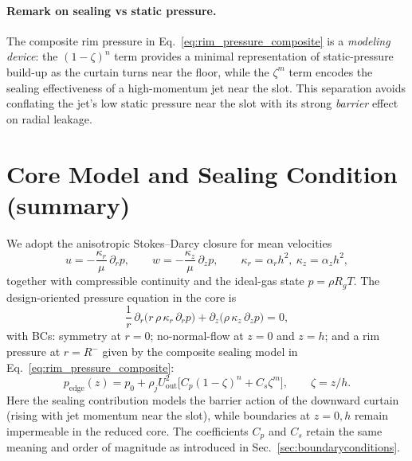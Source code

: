 \documentclass[11pt,a4paper]{article}
\begin{document}
\paragraph{Remark on sealing vs static pressure.}
The composite rim pressure in Eq.~\eqref{eq:rim_pressure_composite} is a
\emph{modeling device}: the $(1-\zeta)^n$ term provides a minimal representation
of static-pressure build-up as the curtain turns near the floor, while the
$\zeta^m$ term encodes the sealing effectiveness of a high-momentum jet near the slot.
This separation avoids conflating the jet’s low static pressure near the slot with
its strong \emph{barrier} effect on radial leakage.

\section{Core Model and Sealing Condition (summary)}
We adopt the anisotropic Stokes--Darcy closure for mean velocities
\begin{equation}
  u = -\frac{\kappa_r}{\mu}\,\partial_r p,\qquad
  w = -\frac{\kappa_z}{\mu}\,\partial_z p,\qquad
  \kappa_r=\alpha_r h^2,\ \kappa_z=\alpha_z h^2,
\end{equation}
together with compressible continuity and the ideal-gas state $p=\rho R_g T$.
The design-oriented pressure equation in the core is
\begin{equation}
  \frac{1}{r}\,\partial_r\!\big(r\,\rho\,\kappa_r\,\partial_r p\big)
  +\partial_z\!\big(\rho\,\kappa_z\,\partial_z p\big)=0,
\end{equation}
with BCs: symmetry at $r=0$; no-normal-flow at $z=0$ and $z=h$; and a rim pressure
at $r=R^{-}$ given by the composite sealing model in
Eq.~\eqref{eq:rim_pressure_composite}:
\begin{equation}
  p_{\mathrm{edge}}(z) = p_0 + \rho_j U_{\mathrm{out}}^2
  \big[ C_p(1-\zeta)^{n} + C_s \zeta^{m} \big], \qquad \zeta=z/h.
\end{equation}
Here the sealing contribution models the barrier action of the downward curtain
(rising with jet momentum near the slot), while boundaries at $z=0,h$ remain
impermeable in the reduced core. The coefficients $C_p$ and $C_s$ retain the same meaning and order of magnitude as
introduced in Sec.~\ref{sec:boundaryconditions}.
\end{document}
